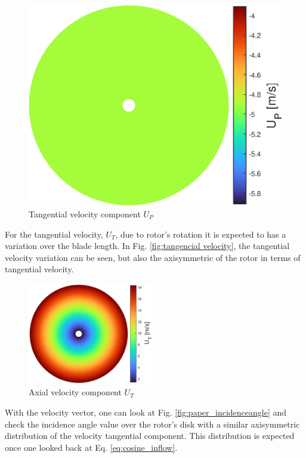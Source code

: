{\begin{figure}[!htb]
\begin{minipage}{0.49\textwidth}
        \includegraphics[width=\textwidth]{Figures/comp_method/sim_B/U_P.eps}
        \caption{Tangential velocity component $U_P$}
        \label{fig:tangential_velocity_paper}
    \end{minipage}
\end{figure} 


For the tangential velocity, $U_T$, due to rotor's rotation it is expected to has a variation over the blade length. In Fig. \ref{fig:tangencial velocity}, the tangential velocity variation can be seen, but also the axisymmetric of the rotor in terms of tangential velocity.
\begin{figure}[!htb]
    \centering
    \includegraphics[width=0.49\textwidth]{Figures/comp_method/sim_B/U_T.eps}
    \caption{Axial velocity component $U_T$}
    \label{fig:axial_velocity_paper}
\end{figure}

With the velocity vector, one can look at Fig. \ref{fig:paper_incidenceangle} and check the incidence angle value over the rotor's disk with a similar axisymmetric distribution of the velocity tangential component. This distribution is expected once one looked back at Eq. \ref{eq:cosine_inflow}.

}
